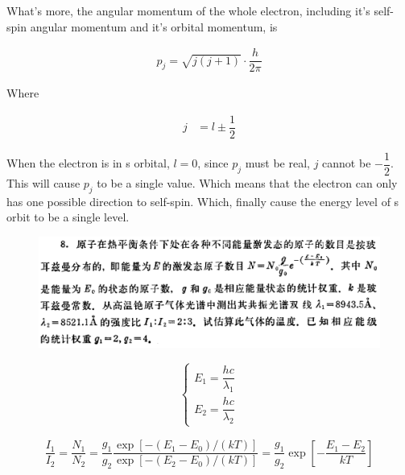 \documentclass{article}
\begin{document}
What's more, the angular momentum of the whole electron, including it's self-spin angular momentum and it's orbital momentum, is

\begin{equation*}
  \begin{aligned}
    p_j = \sqrt{j \left( j + 1 \right)} \cdot \dfrac{h}{2 \pi} 
  \end{aligned}
\end{equation*}

Where

\begin{equation*}
  \begin{aligned}
    j &= l \pm \dfrac{1}{2}  
  \end{aligned}
\end{equation*}

When the electron is in s orbital, $l = 0$, since $p_j$ must be real, $j$ cannot be $-\dfrac{1}{2} $. This will cause $p_j$ to be a single value. Which means that the electron can only has one possible direction to self-spin. Which, finally cause the energy level of s orbit to be a single level.

\begin{figure}[H]
  \centering
  \includegraphics[width=\linewidth]{figures/8}
  \label{fig:}
\end{figure}

\begin{equation*}
  \left\{
  \begin{aligned}
    E_1 = \dfrac{hc}{\lambda_1} \\
    E_2 = \dfrac{hc}{\lambda_2} 
  \end{aligned}
  \right.
\end{equation*}

\begin{equation*}
  \begin{aligned}
    \dfrac{I_1}{I_2} = \dfrac{N_1}{N_2} = \dfrac{g_1}{g_2} \dfrac{\exp \left[ - \left( E_1 - E_0 \right) / \left( kT \right) \right]}{\exp \left[ - \left( E_2 - E_0 \right) / \left( kT \right) \right]} = \dfrac{g_1}{g_2} \exp \left[ - \dfrac{E_1 - E_2}{kT}  \right] 
  \end{aligned}
\end{equation*}
\end{document}
